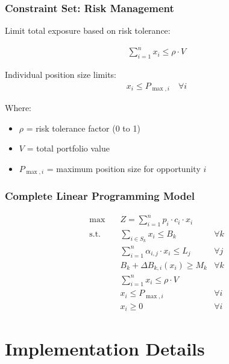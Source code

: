 \documentclass{beamer}
\begin{document}
\begin{frame}
\frametitle{Constraint Set: Risk Management}
Limit total exposure based on risk tolerance:

\begin{align}
\sum_{i=1}^{n} x_i \leq \rho \cdot V
\end{align}

Individual position size limits:
\begin{align}
x_i \leq P_{\max,i} \quad \forall i
\end{align}

Where:
\begin{itemize}
    \item $\rho$ = risk tolerance factor (0 to 1)
    \item $V$ = total portfolio value
    \item $P_{\max,i}$ = maximum position size for opportunity $i$
\end{itemize}
\end{frame}

\begin{frame}
\frametitle{Complete Linear Programming Model}
\begin{align}
\max \quad & Z = \sum_{i=1}^{n} p_i \cdot c_i \cdot x_i \\
\text{s.t.} \quad & \sum_{i \in S_k} x_i \leq B_k & \forall k \\
& \sum_{i=1}^{n} \alpha_{i,j} \cdot x_i \leq L_j & \forall j \\
& B_k + \Delta B_{k,i}(x_i) \geq M_k & \forall k \\
& \sum_{i=1}^{n} x_i \leq \rho \cdot V \\
& x_i \leq P_{\max,i} & \forall i \\
& x_i \geq 0 & \forall i
\end{align}
\end{frame}

\section{Implementation Details}
\end{document}
